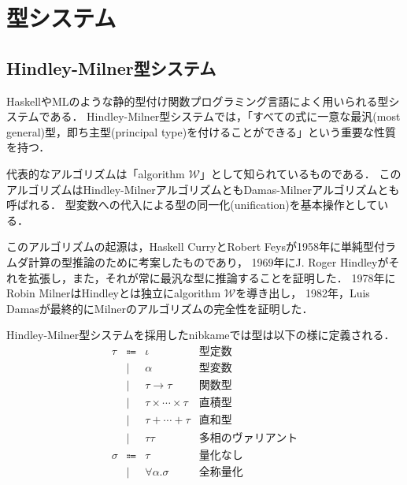 \documentclass[a4paper,titlepage,report]{jsbook}
\newcommand{\algorithmW}{algorithm $\mathscr{W}$}
\begin{document}
\section{型システム}\label{sec:型システム}

\subsection{Hindley-Milner型システム}\label{ssec:Hindley-Milner型システム}
HaskellやMLのような静的型付け関数プログラミング言語によく用いられる型システムである．
Hindley-Milner型システムでは，「すべての式に一意な最汎(most general)型，即ち主型(principal type)を付けることができる」という重要な性質を持つ．

代表的なアルゴリズムは「\algorithmW」\cite{Milner1978348}\cite{Damas:1982:PTF:582153.582176}として知られているものである．
このアルゴリズムはHindley-MilnerアルゴリズムともDamas-Milnerアルゴリズムとも呼ばれる．
型変数への代入による型の同一化(unification)を基本操作としている．

このアルゴリズムの起源は，Haskell CurryとRobert Feysが1958年に単純型付ラムダ計算の型推論のために考案したものであり，
1969年にJ. Roger Hindleyがそれを拡張し，また，それが常に最汎な型に推論することを証明した．
1978年にRobin MilnerはHindleyとは独立に\algorithmW\cite{Milner1978348}を導き出し，
1982年，Luis Damasが最終的にMilnerのアルゴリズムの完全性を証明した\cite{Damas:1982:PTF:582153.582176}．

Hindley-Milner型システムを採用したnibkameでは型は以下の様に定義される．
\begin{equation}\label{eq:type} 
\begin{array}{rcll}
    \tau    &\Coloneqq& \iota                       & \text{型定数} \\
            &\mid&  \alpha                          & \text{型変数} \\
            &\mid&  \tau \rightarrow \tau           & \text{関数型} \\
            &\mid&  \tau \times \cdots \times \tau  & \text{直積型} \\
            &\mid&  \tau + \cdots + \tau            & \text{直和型} \\
            &\mid&  \tau \tau                       & \text{多相のヴァリアント} \\
    \sigma  &\Coloneqq & \tau                       & \text{量化なし} \\
            &\mid&  \forall \alpha. \sigma          & \text{全称量化}
\end{array}
\end{equation}
\end{document}
